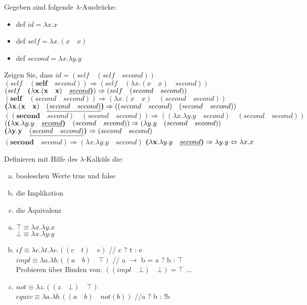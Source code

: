 \begin{card}
  Gegeben sind folgende $\lambda$-Ausdrücke:
  \begin{itemize}
    \item def $id = \lambda x.x$
    \item def $self = \lambda x.(x \quad x)$
    \item def $second = \lambda x.\lambda y. y$
  \end{itemize}
  Zeigen Sie, dass $id = (self \quad (self \quad second))$
  \hr
  $(self \quad (\textbf{self} \quad second)) \Rightarrow (self \quad (\lambda x.(x \quad x) \quad second))$
  \vfill
  $(self \quad \textbf{(}\lambda \textbf{x}.(\textbf{x} \quad \textbf{x}) \quad \uline{second}\textbf{)}) \Rightarrow 
  (self \quad (second \quad second))$
  \vfill
  $(\textbf{self} \quad (second \quad second)) \Rightarrow 
  (\lambda x.(x \quad x) \quad (second \quad second))$
  \vfill
  $\textbf{(}\lambda \textbf{x}.(\textbf{x} \quad \textbf{x}) \quad \uline{(second \quad second)}\textbf{)} \Rightarrow
  ((second \quad second) \quad (second \quad second))$
  \vfill
  $((\textbf{second} \quad second) \quad (second \quad second)) \Rightarrow ((\lambda x.\lambda y. y \quad second) \quad (second \quad second))$
  \vfill
  $(\textbf{(}\lambda \textbf{x}.\lambda y. y \quad \uline{second}\textbf{)} \quad (second \quad second)) \Rightarrow (\lambda y. y \quad (second \quad second))$
  \vfill
  $\textbf{(}\lambda \textbf{y}. \textbf{y} \quad \uline{(second \quad second)}\textbf{)} \Rightarrow (second \quad second)$
  \vfill
  $(\textbf{second} \quad second) \Rightarrow (\lambda x.\lambda y. y \quad second)$
  \vfill
  $\textbf{(}\lambda \textbf{x}.\lambda y. y \quad \uline{second}\textbf{)} \Rightarrow \lambda y. y \Leftrightarrow \lambda x.x$
\end{card}

\begin{card}
	Definieren mit Hilfe des $\lambda$-Kalküls die:
	\begin{enumerate}[a)]
    \item booleschen Werte true und false
    \item die Implikation
    \item die Äquivalenz
	\end{enumerate}
	\hr
	\begin{enumerate}[a)]
    \item $\top \equiv \lambda x.\lambda y . x$\\
        $\bot \equiv \lambda x.\lambda y . y$
    \item $if \equiv \lambda c.\lambda t.\lambda e.((c \quad t) \quad e)$ // c ? t : e\\
        $impl \equiv \lambda a.\lambda b.((a \quad b) \quad \top)$ // a $\rightarrow$ b = a ? b : $\top$\\
        Probieren über Binden von: $((impl \quad \bot) \quad \bot) = \top$ ...
    \item	$not \equiv \lambda z.((z \quad \bot) \quad \top)$\\
        $equiv \equiv  \lambda a.\lambda b.((a \quad b) \quad not(b))$ //a ? b : !b
	\end{enumerate}
\end{card}

